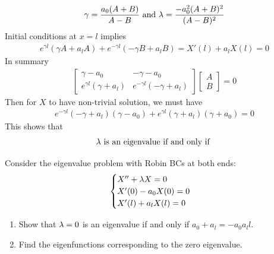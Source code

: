 \documentclass{report}
\begin{document}
\begin{mdframed}
\begin{align*}
\gamma = \frac{a_0(A+B)}{A-B}\text{ and }\lambda = \frac{-a_0^2(A+B)^2}{(A-B)^2}
\end{align*}
Initial conditions at $x=l$ implies 
\begin{align*}
e^{\gamma l}(\gamma A+a_lA)+e^{- \gamma l}(-\gamma B+a_lB)= X'(l)+a_lX(l)=0 
\end{align*}
In summary 
 \begin{align*}
\begin{bmatrix}
  \gamma -a_0 & -\gamma -a_0 \\
  e^{\gamma l}(\gamma +a_l) & e^{-\gamma l}(-\gamma +a_l)
\end{bmatrix} \begin{bmatrix}
A\\
B
\end{bmatrix}=0
\end{align*}
Then for $X$ to have non-trivial solution, we must have 
\begin{align*}
e^{-\gamma l}(-\gamma +a_l)(\gamma -a_0)+e^{\gamma l}(\gamma +a_l)(\gamma +a_0)=0
\end{align*}
This shows that 
\begin{align*}
\lambda \text{ is an eigenvalue if and only if } 
\end{align*}
\end{mdframed}
\begin{question}{}{}
Consider the eigenvalue problem with Robin BCs at both ends: 
\begin{align*}
\begin{cases}  
X''+\lambda X=0\\
X'(0)-a_0X(0)=0\\
X'(l)+a_lX(l)=0
\end{cases}
\end{align*}
\begin{enumerate}[label=(\alph*)]
  \item Show that $\lambda =0$ is an eigenvalue if and only if $a_0+a_l=-a_0a_ll$. 
  \item Find the eigenfunctions corresponding to the zero eigenvalue. 
\end{enumerate}
\end{question}
\end{document}
